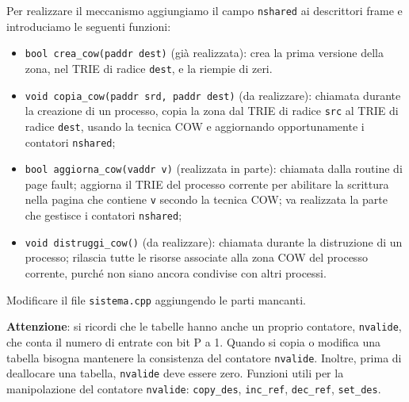 Per realizzare il meccanismo aggiungiamo il campo \verb|nshared| ai descrittori frame e introduciamo
le seguenti funzioni:
\begin{itemize}
\item \verb|bool crea_cow(paddr dest)| (gi\`a realizzata): crea la prima versione della zona,
nel TRIE di radice \verb|dest|, e la riempie di zeri.
\item \verb|void copia_cow(paddr srd, paddr dest)| (da realizzare): chiamata durante la creazione
di un processo, copia la zona dal TRIE di radice \verb|src| al TRIE di radice \verb|dest|, usando
la tecnica COW e aggiornando opportunamente i contatori \verb|nshared|;
\item \verb|bool aggiorna_cow(vaddr v)| (realizzata in parte): chiamata dalla routine di page fault;
aggiorna il TRIE del processo corrente per abilitare la scrittura nella pagina che contiene \verb|v| secondo
la tecnica COW; va realizzata la parte che gestisce i contatori \verb|nshared|;
\item \verb|void distruggi_cow()| (da realizzare): chiamata durante la distruzione di un processo;
rilascia tutte le risorse associate alla zona COW del processo corrente, purch\'e non siano ancora
condivise con altri processi.
\end{itemize}

Modificare il file \verb|sistema.cpp| aggiungendo le parti mancanti.

{\bf Attenzione}: si ricordi che le tabelle hanno anche un proprio contatore, \verb|nvalide|, che
conta il numero di entrate con bit P a 1. Quando si copia o modifica una tabella bisogna mantenere
la consistenza del contatore \verb|nvalide|. Inoltre, prima di deallocare una tabella, \verb|nvalide| deve essere
zero. Funzioni utili per la manipolazione del contatore \verb|nvalide|: \verb|copy_des|, \verb|inc_ref|, \verb|dec_ref|, \verb|set_des|.
